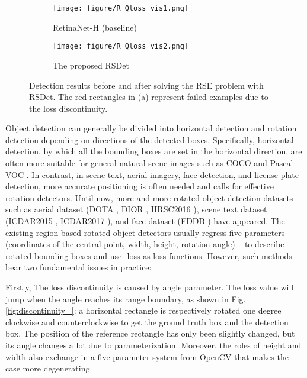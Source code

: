 \documentclass[10pt,twocolumn,letterpaper]{article}
\begin{document}
\begin{figure}[!tb]
    \centering
    \begin{subfigure}{.235\textwidth}
        \centering    \texttt{[image: figure/R\_Qloss\_vis1.png]}
        \caption{RetinaNet-H \cite{R20_Yang2019R3Det} (baseline)}
        \label{fig:R_Qloss_vis2}
    \end{subfigure}
    \begin{subfigure}{.235\textwidth}
        \centering    \texttt{[image: figure/R\_Qloss\_vis2.png]}
        \caption{The proposed RSDet}
        \label{fig:R_Qloss_vis1}
    \end{subfigure}
    \vspace{-10pt}
    \caption{Detection results before and after solving the RSE problem with RSDet. The red rectangles in (a) represent failed examples due to the loss discontinuity.}
    \label{fig:R_Qloss_vis}
    \vspace{-15pt}
\end{figure}
Object detection can generally be divided into horizontal detection and rotation detection depending on directions of the detected boxes. Specifically, horizontal detection, by which all the bounding boxes are set in the horizontal direction, are often more suitable for general natural scene images such as COCO \cite{R23_lin2014microsoft} and Pascal VOC \cite{everingham2010pascal}. In contrast, in scene text, aerial imagery, face detection, and license plate detection, more accurate positioning is often needed and calls for effective rotation detectors. Until now, more and more rotated object detection datasets such as aerial dataset (DOTA \cite{R18_xia2018dota}, DIOR \cite{li2019object}, HRSC2016 \cite{R19_zk2017high}), scene text dataset (ICDAR2015 \cite{karatzas2015icdar}, ICDAR2017 \cite{gomez2017icdar2017}), and face dataset (FDDB \cite{jain2010fddb}) have appeared. The existing region-based rotated object detectors usually regress five parameters (coordinates of the central point, width, height, rotation angle) ~\cite{R20_Yang2019R3Det,R21_yang2018automatic,R22_Jiang2017R2CNN,R30_ma2018arbitrary} to describe rotated bounding boxes and use -loss as loss functions. However, such methods bear two fundamental issues in practice:

Firstly, The loss discontinuity is caused by angle parameter. The loss value will jump when the angle reaches its range boundary, as shown in Fig. \ref{fig:discontinuity_}: a horizontal rectangle is respectively rotated one degree clockwise and counterclockwise to get the ground truth box and the detection box. The position of the reference rectangle has only been slightly changed, but its angle changes a lot due to parameterization. Moreover, the roles of height and width also exchange in a five-parameter system from OpenCV that makes the case more degenerating.
\end{document}
